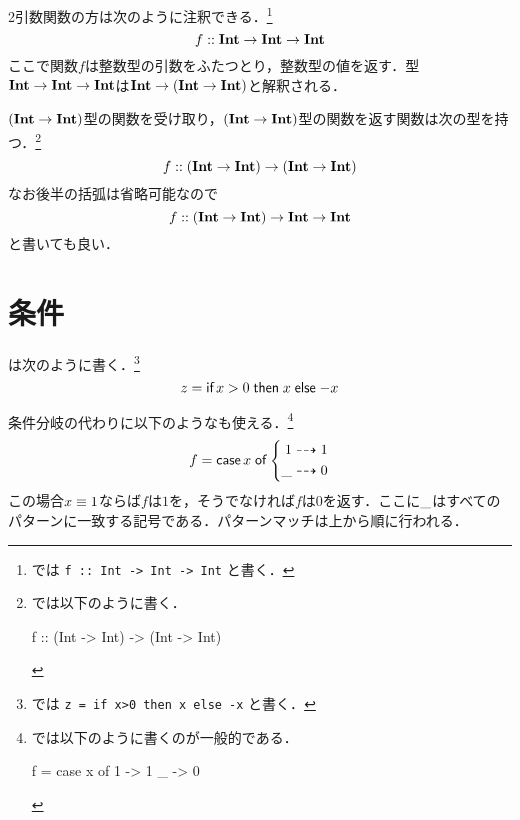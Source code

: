 \documentclass[platex,a5paper,twoside,fleqn,draft]{jsbook}
\newcommand{\keyword}[1]{\textgt{\textbf{#1}}}
\begin{document}
2引数関数の方は次のように注釈できる．\footnote{\haskell では \verb|f :: Int -> Int -> Int| と書く．}
\begin{equation}
f::\mathord{\mathbf{Int}}\rightarrow\mathord{\mathbf{Int}}\rightarrow\mathord{\mathbf{Int}}
\end{equation}
ここで関数$f$は整数型の引数をふたつとり，整数型の値を返す．型$\mathord{\mathbf{Int}}\rightarrow\mathord{\mathbf{Int}}\rightarrow\mathord{\mathbf{Int}}$は$\mathord{\mathbf{Int}}\rightarrow\left(\mathord{\mathbf{Int}}\rightarrow\mathord{\mathbf{Int}}\right)$と解釈される．

$(\mathord{\mathbf{Int}}\rightarrow\mathord{\mathbf{Int}})$型の関数を受け取り，$(\mathord{\mathbf{Int}}\rightarrow\mathord{\mathbf{Int}})$型の関数を返す関数は次の型を持つ．\footnote{\haskell では以下のように書く．
\begin{footcode}
      f :: (Int -> Int) -> (Int -> Int)
\end{footcode}}
\begin{equation}
f::\left(\mathord{\mathbf{Int}}\rightarrow\mathord{\mathbf{Int}}\right)\rightarrow\left(\mathord{\mathbf{Int}}\rightarrow\mathord{\mathbf{Int}}\right)
\end{equation}
なお後半の括弧は省略可能なので
\begin{equation}
f::\left(\mathord{\mathbf{Int}}\rightarrow\mathord{\mathbf{Int}}\right)\rightarrow\mathord{\mathbf{Int}}\rightarrow\mathord{\mathbf{Int}}
\end{equation}
と書いても良い．

\section{条件}

\keyword{条件分岐}は次のように書く．\footnote{\haskell では \verb|z = if x>0 then x else -x| と書く．}
\begin{equation}
z=\mathord{\textsf{if}}\,x>0\mathrel{\textsf{then}}x\mathrel{\textsf{else}}-x
\end{equation}

条件分岐の代わりに以下のような\keyword{パターンマッチ}も使える．\footnote{\haskell では以下のように書くのが一般的である．
\begin{footcode}
      f = case x of 1 -> 1
                    _ -> 0
\end{footcode}}
\begin{equation}
f=\mathord{\textsf{case}}\,x\mathrel{\textsf{of}}\left\{\begin{aligned}1&\dashrightarrow1\\\_&\dashrightarrow0\end{aligned}\right.
\end{equation}
この場合$x\equiv1$ならば$f$は$1$を，そうでなければ$f$は$0$を返す．ここに$\_$はすべてのパターンに一致する記号である．パターンマッチは上から順に行われる．
\end{document}
